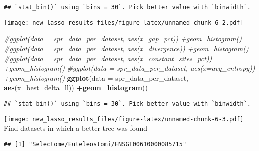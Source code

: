 \documentclass[
]{article}
\newenvironment{Shaded}{\begin{snugshade}}{\end{snugshade}}
\newcommand{\CommentTok}[1]{\textcolor[rgb]{0.56,0.35,0.01}{\textit{#1}}}
\newcommand{\DataTypeTok}[1]{\textcolor[rgb]{0.13,0.29,0.53}{#1}}
\newcommand{\DecValTok}[1]{\textcolor[rgb]{0.00,0.00,0.81}{#1}}
\newcommand{\KeywordTok}[1]{\textcolor[rgb]{0.13,0.29,0.53}{\textbf{#1}}}
\newcommand{\NormalTok}[1]{#1}
\newcommand{\OperatorTok}[1]{\textcolor[rgb]{0.81,0.36,0.00}{\textbf{#1}}}
\newcommand{\StringTok}[1]{\textcolor[rgb]{0.31,0.60,0.02}{#1}}
\begin{document}
\begin{verbatim}
## `stat_bin()` using `bins = 30`. Pick better value with `binwidth`.
\end{verbatim}

\texttt{[image: new\_lasso\_results\_files/figure-latex/unnamed-chunk-6-2.pdf]}

\begin{Shaded}
\begin{Highlighting}[]
\CommentTok{#ggplot(data = spr_data_per_dataset, aes(x=gap_pct)) +geom_histogram()}
\CommentTok{#ggplot(data = spr_data_per_dataset, aes(x=divergence)) +geom_histogram()}
\CommentTok{#ggplot(data = spr_data_per_dataset, aes(x=constant_sites_pct)) +geom_histogram()}
\CommentTok{#ggplot(data = spr_data_per_dataset, aes(x=avg_entropy)) +geom_histogram()}
\KeywordTok{ggplot}\NormalTok{(}\DataTypeTok{data =}\NormalTok{ spr_data_per_dataset, }\KeywordTok{aes}\NormalTok{(}\DataTypeTok{x=}\NormalTok{best_delta_ll)) }\OperatorTok{+}\KeywordTok{geom_histogram}\NormalTok{()}
\end{Highlighting}
\end{Shaded}

\begin{verbatim}
## `stat_bin()` using `bins = 30`. Pick better value with `binwidth`.
\end{verbatim}

\texttt{[image: new\_lasso\_results\_files/figure-latex/unnamed-chunk-6-3.pdf]}
Find datasets in which a better tree was found

\begin{Shaded}
\end{Shaded}

\begin{verbatim}
## [1] "Selectome/Euteleostomi/ENSGT00610000085715"
\end{verbatim}

\begin{Shaded}
\end{Shaded}
\end{document}
